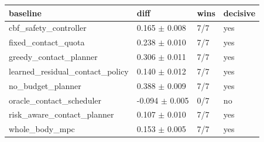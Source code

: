 \begin{tabular}{llll}
\toprule
baseline & diff & wins & decisive \\
\midrule
cbf\_safety\_controller & 0.165 $\pm$ 0.008 & 7/7 & yes \\
fixed\_contact\_quota & 0.238 $\pm$ 0.010 & 7/7 & yes \\
greedy\_contact\_planner & 0.306 $\pm$ 0.011 & 7/7 & yes \\
learned\_residual\_contact\_policy & 0.140 $\pm$ 0.012 & 7/7 & yes \\
no\_budget\_planner & 0.388 $\pm$ 0.009 & 7/7 & yes \\
oracle\_contact\_scheduler & -0.094 $\pm$ 0.005 & 0/7 & no \\
risk\_aware\_contact\_planner & 0.107 $\pm$ 0.010 & 7/7 & yes \\
whole\_body\_mpc & 0.153 $\pm$ 0.005 & 7/7 & yes \\
\bottomrule
\end{tabular}
